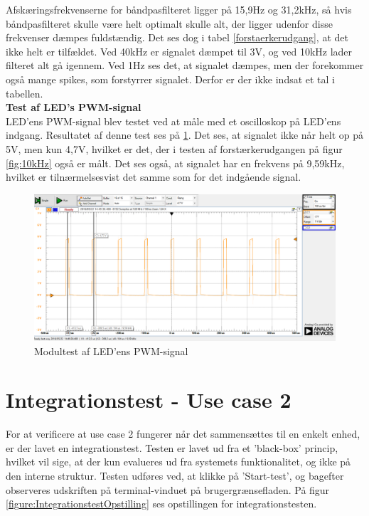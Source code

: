 \noindent Afskæringsfrekvenserne for båndpasfilteret ligger på 15,9Hz og 31,2kHz, så hvis båndpasfilteret skulle være helt optimalt skulle alt, der ligger udenfor disse frekvenser dæmpes fuldstændig. Det ses dog i tabel \ref{forstaerkerudgang}, at det ikke helt er tilfældet. Ved 40kHz er signalet dæmpet til 3V, og ved 10kHz lader filteret alt gå igennem. Ved 1Hz ses det, at signalet dæmpes, men der forekommer også mange spikes, som forstyrrer signalet. Derfor er der ikke indsat et tal i tabellen. \\

\noindent \textbf{Test af LED's PWM-signal} \\
\noindent LED'ens PWM-signal blev testet ved at måle med et oscilloskop på LED'ens indgang. Resultatet af denne test ses på \ref{fig:LED_indgang}. Det ses, at signalet ikke når helt op på 5V, men kun 4,7V, hvilket er det, der i testen af forstærkerudgangen på figur \ref{fig:10kHz} også er målt. Det ses også, at signalet har en frekvens på 9,59kHz, hvilket er tilnærmelsesvist det samme som for det indgående signal. 

\begin{figure}[H]
	\centering
	\includegraphics[width=\textwidth]{Test/images/AffyringTest/LED_indgang}
	\caption{Modultest af LED'ens PWM-signal}
	\label{fig:LED_indgang}
\end{figure}

\section{Integrationstest - Use case 2}
For at verificere at use case 2 fungerer når det sammensættes til en enkelt enhed, er der lavet en integrationstest. Testen er lavet ud fra et 'black-box' princip, hvilket vil sige, at der kun evalueres ud fra systemets funktionalitet, og ikke på den interne struktur. Testen udføres ved, at klikke på 'Start-test', og bagefter observeres udskriften på terminal-vinduet på brugergrænsefladen. På figur \ref{figure:IntegrationstestOpstilling} ses opstillingen for integrationstesten.

